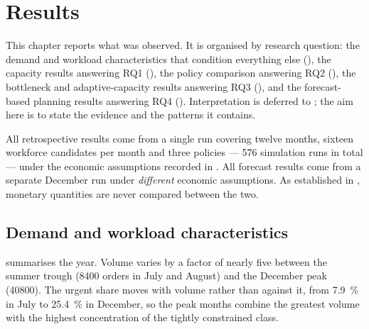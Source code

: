 \chapter{Results}
\label{ch:results}

This chapter reports what was observed. It is organised by research question: the demand and
workload characteristics that condition everything else (), the capacity
results answering RQ1 (), the policy comparison answering RQ2
(), the bottleneck and adaptive-capacity results answering RQ3
(), and the forecast-based planning results answering RQ4
(). Interpretation is deferred to ; the aim here is to
state the evidence and the patterns it contains.

All retrospective results come from a single run covering twelve months, sixteen workforce
candidates per month and three policies --- 576 simulation runs in total --- under the economic
assumptions recorded in . All forecast results come from a separate
December run under \emph{different} economic assumptions. As established in
, monetary quantities are never compared between the two.

\section{Demand and workload characteristics}
\label{sec:res-demand}

 summarises the year. Volume varies by a factor of nearly five between
the summer trough (\num{8400} orders in July and August) and the December peak
(\num{40800}). The urgent share moves with volume rather than against it, from
\SI{7.9}{\percent} in July to \SI{25.4}{\percent} in December, so the peak months combine the
greatest volume with the highest concentration of the tightly constrained class.

